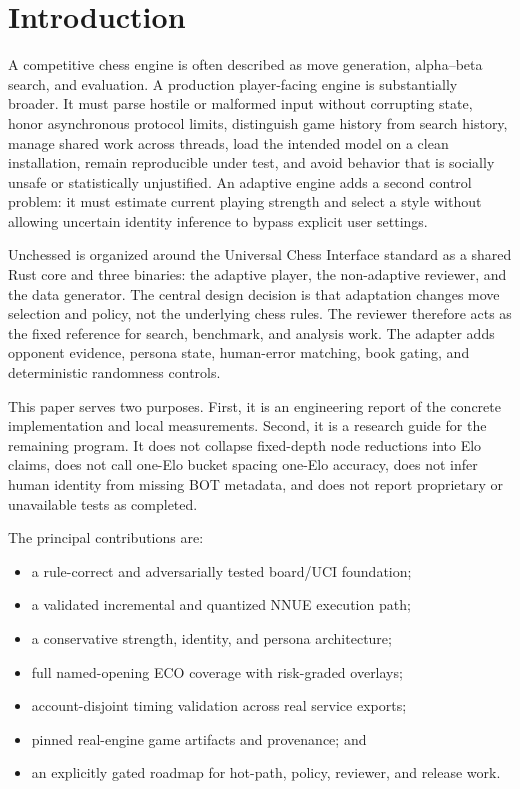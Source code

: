 \documentclass[conference]{IEEEtranSSP}
\begin{document}
\section{Introduction}
A competitive chess engine is often described as move generation, alpha--beta search, and evaluation. A production player-facing engine is substantially broader. It must parse hostile or malformed input without corrupting state, honor asynchronous protocol limits, distinguish game history from search history, manage shared work across threads, load the intended model on a clean installation, remain reproducible under test, and avoid behavior that is socially unsafe or statistically unjustified. An adaptive engine adds a second control problem: it must estimate current playing strength and select a style without allowing uncertain identity inference to bypass explicit user settings.

Unchessed is organized around the Universal Chess Interface standard \cite{uci} as a shared Rust core and three binaries: the adaptive player, the non-adaptive reviewer, and the data generator. The central design decision is that adaptation changes move selection and policy, not the underlying chess rules. The reviewer therefore acts as the fixed reference for search, benchmark, and analysis work. The adapter adds opponent evidence, persona state, human-error matching, book gating, and deterministic randomness controls.

This paper serves two purposes. First, it is an engineering report of the concrete implementation and local measurements. Second, it is a research guide for the remaining program. It does not collapse fixed-depth node reductions into Elo claims, does not call one-Elo bucket spacing one-Elo accuracy, does not infer human identity from missing BOT metadata, and does not report proprietary or unavailable tests as completed.

The principal contributions are:
\begin{itemize}
  \item a rule-correct and adversarially tested board/UCI foundation;
  \item a validated incremental and quantized NNUE execution path;
  \item a conservative strength, identity, and persona architecture;
  \item full named-opening ECO coverage with risk-graded overlays;
  \item account-disjoint timing validation across real service exports;
  \item pinned real-engine game artifacts and provenance; and
  \item an explicitly gated roadmap for hot-path, policy, reviewer, and release work.
\end{itemize}
\end{document}
